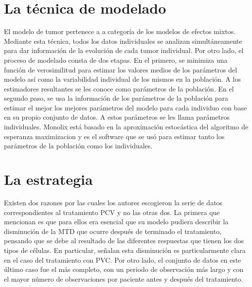 \documentclass[letterpaper,12pt]{article}
\theoremstyle{definition} \newtheorem{Def}{Definición}[section]
\theoremstyle{definition} \newtheorem{Teo}{Teorema}[section]
\theoremstyle{definition} \newtheorem{Pro}{Proposición}
\theoremstyle{definition} \newtheorem{Lema}{Lema}[section]
\theoremstyle{definition} \newtheorem{Cor}{Corolario}[section]
\begin{document}
\section{La técnica de modelado}

El modelo de tumor pertenece a a categoría de los modelos de efectos mixtos. Mediante esta técnica, todos los datos individuales se analizan simultáneamente para dar información de la evolución de cada tumor individual. Por otro lado, el proceso de modelado consta de dos etapas. En el primero, se minimiza una función de verosimilitud para estimar los valores medios de los parámetros del modelo así como la variabilidad individual de los mismos en la población. A los estimadores resultantes se les conoce como parámetros de la población. En el segundo paso, se usa la información de los parámetros de la población para estimar el mejor los mejores parámetros del modelo para cada individuo con base en su propio conjunto de datos. A estos parámetros se les llama parámetros individuales. Monolix está basado en la aproximación estocástica del algoritmo de esperanza maximizacion y es el software que se usó para estimar tanto los parámetros de la población como los individuales.
\section{La estrategia}

Existen dos razones por las cuales los autores escogieron la serie de datos correspondientes al tratamiento PCV y no las otras dos. La primera que mencionan es que para ellos era esencial que su modelo pudiera describir la disminución de la MTD que ocurre después de terminado el tratamiento, pensando que se debe al resultado de las diferentes respuestas que tienen los dos tipos de células. En particular, señalan esta disminución es particularmente clara en el caso del tratamiento con PVC. Por otro lado, el conjunto de datos en este último caso fue el más completo, con un periodo de observación más largo y con el mayor número de observaciones por paciente antes y después del tratamiento. 
\end{document}

